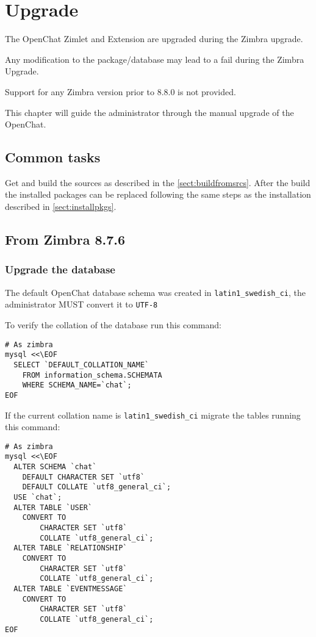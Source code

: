 \chapter{Upgrade}

\begin{warning}
    The OpenChat Zimlet and Extension are upgraded during the Zimbra upgrade.

    Any modification to the package/database may lead to a fail during the Zimbra Upgrade.

    Support for any Zimbra version prior to 8.8.0 is not provided.
\end{warning}

This chapter will guide the administrator through the manual upgrade of the OpenChat.

\section{Common tasks}

    Get and build the sources as described in the \autoref{sect:buildfromsrcs}. After the build the installed packages
    can be replaced following the same steps as the installation described in \autoref{sect:installpkgs}.

\section{From Zimbra 8.7.6}
    \subsection{Upgrade the database}

        The default OpenChat database schema was created in \verb+latin1_swedish_ci+, the administrator MUST convert it to \verb+UTF-8+

        To verify the collation of the database run this command:
        \begin{verbatim}
# As zimbra
mysql <<\EOF
  SELECT `DEFAULT_COLLATION_NAME`
    FROM information_schema.SCHEMATA
    WHERE SCHEMA_NAME=`chat`;
EOF
        \end{verbatim}

        If the current collation name is \verb+latin1_swedish_ci+ migrate the tables running this command:
        \begin{verbatim}
# As zimbra
mysql <<\EOF
  ALTER SCHEMA `chat`
    DEFAULT CHARACTER SET `utf8`
    DEFAULT COLLATE `utf8_general_ci`;
  USE `chat`;
  ALTER TABLE `USER`
    CONVERT TO
        CHARACTER SET `utf8`
        COLLATE `utf8_general_ci`;
  ALTER TABLE `RELATIONSHIP`
    CONVERT TO
        CHARACTER SET `utf8`
        COLLATE `utf8_general_ci`;
  ALTER TABLE `EVENTMESSAGE`
    CONVERT TO
        CHARACTER SET `utf8`
        COLLATE `utf8_general_ci`;
EOF
        \end{verbatim}

